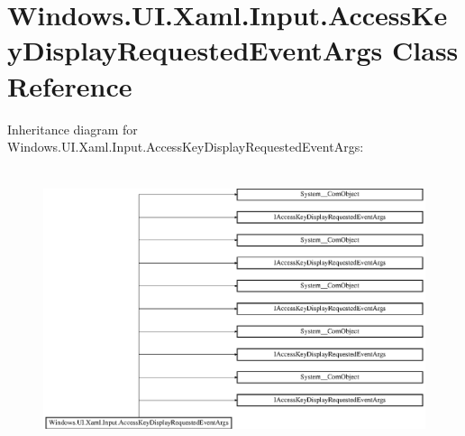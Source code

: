 \hypertarget{class_windows_1_1_u_i_1_1_xaml_1_1_input_1_1_access_key_display_requested_event_args}{}\section{Windows.\+U\+I.\+Xaml.\+Input.\+Access\+Key\+Display\+Requested\+Event\+Args Class Reference}
\label{class_windows_1_1_u_i_1_1_xaml_1_1_input_1_1_access_key_display_requested_event_args}
Inheritance diagram for Windows.\+U\+I.\+Xaml.\+Input.\+Access\+Key\+Display\+Requested\+Event\+Args\+:\begin{figure}[H]
\begin{center}
\leavevmode
\includegraphics[height=8.213333cm]{class_windows_1_1_u_i_1_1_xaml_1_1_input_1_1_access_key_display_requested_event_args}
\end{center}
\end{figure}
